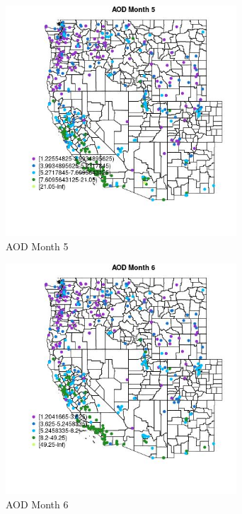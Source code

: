 \begin{figure} 
\centering  
\includegraphics[width=0.77\textwidth]{Code_Outputs/ML_input_report_ML_input_PM25_Step5_part_d_de_duplicated_aves_ML_input_MapObsMo5AOD.jpg} 
\caption{\label{fig:ML_input_report_ML_input_PM25_Step5_part_d_de_duplicated_aves_ML_inputMapObsMo5AOD}AOD Month 5} 
\end{figure} 
 

\begin{figure} 
\centering  
\includegraphics[width=0.77\textwidth]{Code_Outputs/ML_input_report_ML_input_PM25_Step5_part_d_de_duplicated_aves_ML_input_MapObsMo6AOD.jpg} 
\caption{\label{fig:ML_input_report_ML_input_PM25_Step5_part_d_de_duplicated_aves_ML_inputMapObsMo6AOD}AOD Month 6} 
\end{figure} 
 

